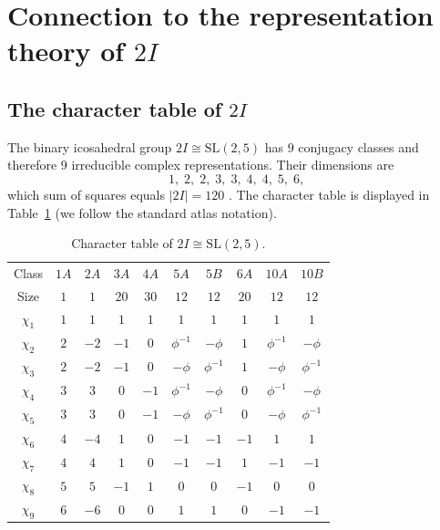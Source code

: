 \documentclass[10pt,reqno]{amsart}
\theoremstyle{plain}
\theoremstyle{definition}
\begin{document}
\section{Connection to the representation theory of $2I$}\label{sec:reptheory}

\subsection{The character table of $2I$}\label{subsec:char}

The binary icosahedral group $2I \cong \mathrm{SL}(2,5)$ has $9$ conjugacy classes and therefore $9$ irreducible complex representations. Their dimensions are
\begin{equation}
1,\; 2,\; 2,\; 3,\; 3,\; 4,\; 4,\; 5,\; 6,
\end{equation}
which sum of squares equals $|2I| = 120$ \cite{Serre1977}. The character table is displayed in Table~\ref{tab:char} (we follow the standard atlas notation).

\begin{table}[htbp]
\centering
\caption{Character table of $2I \cong \mathrm{SL}(2,5)$.}
\label{tab:char}
\begin{tabular}{c|ccccccccc}
\toprule
Class & $1A$ & $2A$ & $3A$ & $4A$ & $5A$ & $5B$ & $6A$ & $10A$ & $10B$ \\
Size  & $1$ & $1$ & $20$ & $30$ & $12$ & $12$ & $20$ & $12$ & $12$ \\
\midrule
$\chi_1$ & $1$ & $1$ & $1$ & $1$ & $1$ & $1$ & $1$ & $1$ & $1$ \\
$\chi_2$ & $2$ & $-2$ & $-1$ & $0$ & $\phi^{-1}$ & $-\phi$ & $1$ & $\phi^{-1}$ & $-\phi$ \\
$\chi_3$ & $2$ & $-2$ & $-1$ & $0$ & $-\phi$ & $\phi^{-1}$ & $1$ & $-\phi$ & $\phi^{-1}$ \\
$\chi_4$ & $3$ & $3$ & $0$ & $-1$ & $\phi^{-1}$ & $-\phi$ & $0$ & $\phi^{-1}$ & $-\phi$ \\
$\chi_5$ & $3$ & $3$ & $0$ & $-1$ & $-\phi$ & $\phi^{-1}$ & $0$ & $-\phi$ & $\phi^{-1}$ \\
$\chi_6$ & $4$ & $-4$ & $1$ & $0$ & $-1$ & $-1$ & $-1$ & $1$ & $1$ \\
$\chi_7$ & $4$ & $4$ & $1$ & $0$ & $-1$ & $-1$ & $1$ & $-1$ & $-1$ \\
$\chi_8$ & $5$ & $5$ & $-1$ & $1$ & $0$ & $0$ & $-1$ & $0$ & $0$ \\
$\chi_9$ & $6$ & $-6$ & $0$ & $0$ & $1$ & $1$ & $0$ & $-1$ & $-1$ \\
\bottomrule
\end{tabular}
\end{table}
\end{document}
